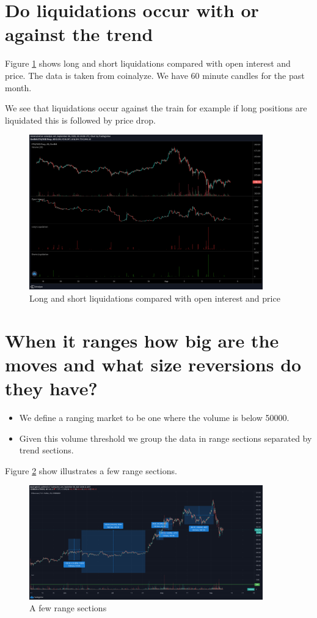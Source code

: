 \section{ Do liquidations occur with or against the trend}

Figure \ref{fig:liq} shows long and short liquidations compared with open interest and price. The data is taken from coinalyze. We have 60 minute candles for the past month. 

We see that liquidations occur against the train for example if long positions are liquidated this is followed by price drop.
\begin{figure}[H]
\center
\includegraphics[width=0.9\textwidth]{fig/liq.png}
\caption{Long and short liquidations compared with open interest and price }
\label{fig:liq}
\end{figure}
\section{ When it ranges how big are the moves and what size reversions do they have?}
\begin{itemize}
\item We define a ranging market to be one where the volume is below 50000.
\item Given this volume threshold we group the data in range sections separated by trend sections. 
\end{itemize}
Figure \ref{fig:ras} show illustrates a few range sections. 
\begin{figure}[H]
\center
\includegraphics[width=0.9\textwidth]{fig/ras.png}
\caption{A few range sections}
\label{fig:ras}
\end{figure}

